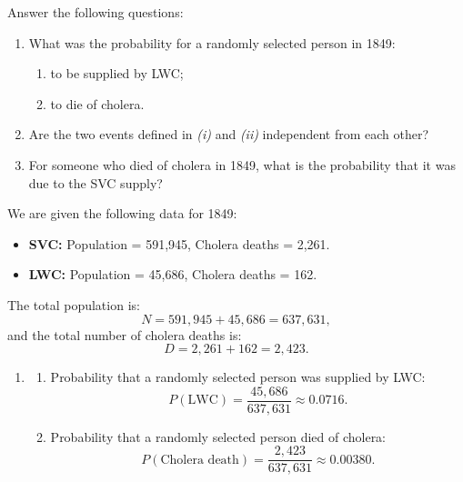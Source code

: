 \documentclass[11pt]{exam}
\begin{document}
\begin{questions}

\question[2.5]
Answer the following questions:
\begin{enumerate}[label=(\alph*)]
    \item What was the probability for a randomly selected person in 1849:
    \begin{enumerate}[label=(\roman*)]
        \item to be supplied by LWC;
        \item to die of cholera.
    \end{enumerate}
    \item Are the two events defined in \textit{(i)} and \textit{(ii)} independent from each other?
    \item For someone who died of cholera in 1849, what is the probability that it was due to the SVC supply?
\end{enumerate}
    
\begin{solution}[0cm]
    We are given the following data for 1849:
    \begin{itemize}
        \item[\tiny$\bullet$] \textbf{SVC:} Population = 591,945, Cholera deaths = 2,261.
        \item[\tiny$\bullet$] \textbf{LWC:} Population = 45,686, Cholera deaths = 162.
    \end{itemize}
    
    The total population is:
    \[
    N = 591{,}945 + 45{,}686 = 637{,}631,
    \]
    and the total number of cholera deaths is:
    \[
    D = 2{,}261 + 162 = 2{,}423.
    \]
    
    \begin{enumerate}[label=(\alph*)]
        \item 
        \begin{enumerate}[label=(\roman*)]
            \item Probability that a randomly selected person was supplied by LWC:
            \[
            P(\text{LWC}) = \frac{45{,}686}{637{,}631} \approx \boxed{0.0716}.
            \]
            
            \item Probability that a randomly selected person died of cholera:
            \[
            P(\text{Cholera death}) = \frac{2{,}423}{637{,}631} \approx \boxed{0.00380}.
            \]
        \end{enumerate}
        

\end{enumerate}
\end{solution}
\end{questions}
\end{document}
